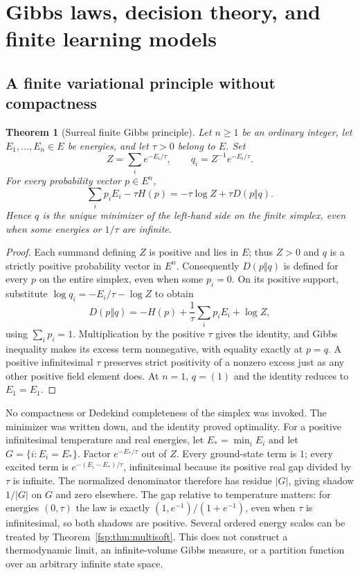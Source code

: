 \documentclass[11pt,a4paper]{article}
\numberwithin{equation}{section}
\newtheorem{theorem}{Theorem}[section]
\theoremstyle{definition}
\theoremstyle{remark}
\begin{document}
\section{Gibbs laws, decision theory, and finite learning models}
\label{fsp:sec:gibbs}

\subsection{A finite variational principle without compactness}

\begin{theorem}[Surreal finite Gibbs principle]\label{fsp:thm:gibbs}
Let $n\ge1$ be an ordinary integer, let $E_1,\ldots,E_n\in E$
be energies, and let $\tau>0$ belong to $E$.
Set
\begin{equation}
 Z=\sum_i e^{-E_i/\tau},\qquad q_i=Z^{-1}e^{-E_i/\tau}.
\end{equation}
For every probability vector $p\in E^n$,
\begin{equation}\label{fsp:eq:gibbs}
 \sum_i p_iE_i-\tau H(p)
 =-\tau\log Z+\tau D(p\Vert q).
\end{equation}
Hence $q$ is the unique minimizer of the left-hand side on the finite
simplex, even when some energies or $1/\tau$ are infinite.
\end{theorem}
\begin{proof}
Each summand defining $Z$ is positive and lies in $E$; thus $Z>0$
and $q$ is a strictly positive probability vector in $E^n$.
Consequently $D(p\Vert q)$ is defined for every $p$ on the entire simplex,
even when some $p_i=0$. On its positive support, substitute
$\log q_i=-E_i/\tau-\log Z$ to obtain
\[
 D(p\Vert q)=-H(p)+\frac1\tau\sum_i p_iE_i+\log Z,
\]
using $\sum_i p_i=1$. Multiplication by the positive $\tau$ gives the
identity, and Gibbs inequality makes its excess term nonnegative, with
equality exactly at $p=q$. A positive infinitesimal $\tau$ preserves
strict positivity of a nonzero excess just as any other positive field
element does. At $n=1$, $q=(1)$ and the identity reduces to $E_1=E_1$.
\end{proof}

No compactness or Dedekind completeness of the simplex was invoked.
The minimizer was written down, and the identity proved optimality.
For a positive infinitesimal temperature and real energies, let
$E_* = \min_i E_i$ and let $G=\{i:E_i=E_*\}$. Factor
$e^{-E_*/\tau}$ out of $Z$. Every ground-state term is $1$; every
excited term is $e^{-(E_i-E_*)/\tau}$, infinitesimal because its positive
real gap divided by $\tau$ is infinite. The normalized denominator
therefore has residue $|G|$, giving shadow $1/|G|$ on $G$ and zero
elsewhere. The gap relative to temperature matters: for energies $(0,\tau)$
the law is exactly $(1,e^{-1})/(1+e^{-1})$, even when $\tau$ is
infinitesimal, so both shadows are positive.
Several ordered energy scales can be treated by
Theorem~\ref{fsp:thm:multisoft}. This does not construct a thermodynamic
limit, an infinite-volume Gibbs measure, or a partition function over
an arbitrary infinite state space.
\end{document}
